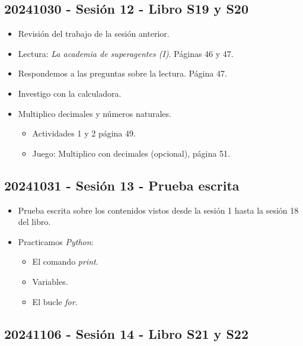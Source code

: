 \documentclass[a4paper,12pt]{article}
\begin{document}
\subsection{20241030 - Sesión 12 - Libro S19 y S20}

\begin{itemize}
    \item Revisión del trabajo de la sesión anterior.
    \item Lectura: \textit{La academia de superagentes (I)}. Páginas 46 y 47.
    \item Respondemos a las preguntas sobre la lectura. Página 47.
    \item Investigo con la calculadora.
    \item Multiplico decimales y números naturales.
    \begin{itemize}
        \item Actividades 1 y 2 página 49.
        \item Juego: Multiplico con decimales (opcional), página 51.
    \end{itemize}
\end{itemize}

\subsection{20241031 - Sesión 13 - Prueba escrita}

\begin{itemize}
    \item Prueba escrita sobre los contenidos vistos desde la sesión 1 hasta la sesión 18 del libro.
    \item Practicamos \textit{Python}:
    \begin{itemize}
        \item El comando \textit{print}.
        \item Variables.
        \item El bucle \textit{for}.
    \end{itemize}
\end{itemize}

\subsection{20241106 - Sesión 14 - Libro S21 y S22}
\end{document}

